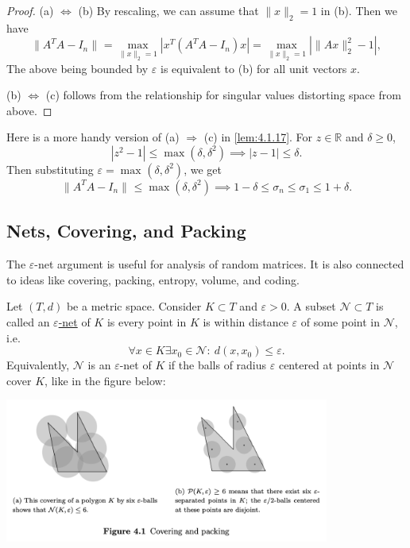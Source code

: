 \begin{proof}
(a) $\Leftrightarrow$ (b) By rescaling, we can assume that $\lVert x \rVert_{2} = 1$ in (b). Then we have 
\[ \lVert A^T A - I_n \rVert_{} = \max_{\lVert x \rVert_{2} = 1} 
|x^T (A^T A - I_n)x| = \max_{\lVert x \rVert_{2} = 1} |\lVert Ax \rVert_{2}^2 - 1|, \]
The above being bounded by $\varepsilon$ is equivalent to (b) for all unit vectors $x$.

(b) $\Leftrightarrow$ (c) follows from the relationship for singular values distorting space from above.
\end{proof}

\begin{remark}[]
\label{rmk:4.1.18}
Here is a more handy version of (a) $\Rightarrow$ (c) in \cref{lem:4.1.17}. For $z \in \mathbb{R}$ and 
$\delta \geq 0$, 
\[ |z^2 - 1| \leq \max_{}(\delta, \delta^2) \implies |z - 1| \leq \delta. \]
Then substituting $\varepsilon = \max_{}(\delta, \delta^2)$, we get 
\[ \lVert A^T A - I_n \rVert_{} \leq \max_{}(\delta, \delta^2)  
\implies 1 - \delta \leq \sigma_n \leq \sigma_1 \leq 1 + \delta. \]
\end{remark}



\subsection{Nets, Covering, and Packing}
The $\varepsilon$-net argument is useful for analysis of random matrices. It is also connected to ideas like 
covering, packing, entropy, volume, and coding.

\begin{definition}[]
\label{def:4.2.1}
Let $(T, d)$ be a metric space. Consider $K \subset T$ and $\varepsilon > 0$. A subset $\mathcal{N} \subset 
T$ is called an \underline{$\varepsilon$-net} of $K$ is every point in $K$ is within distance $\varepsilon$ 
of some point in $\mathcal{N}$, i.e.
\[ \forall x \in K \exists x_0 \in \mathcal{N}: \ d(x, x_0) \leq \varepsilon. \]
Equivalently, $\mathcal{N}$ is an $\varepsilon$-net of $K$ if the balls of radius $\varepsilon$ centered at 
points in $\mathcal{N}$ cover $K$, like in the figure below:

\begin{center}
	\includegraphics[width=0.8\textwidth]{Chapter 4/fig4-1.png}
\end{center}
\end{definition}

